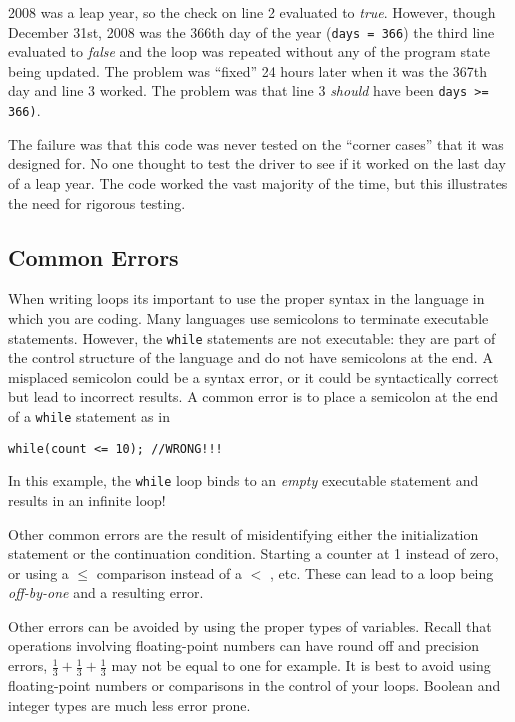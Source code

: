 2008 was a leap year, so the check on line 2 evaluated to \emph{true}.
However, though December 31st, 2008 was the 366th day of the year (\texttt{days = 366})
the third line evaluated to \emph{false} and the loop was repeated without any of
the program state being updated.  The problem was ``fixed'' 24 hours later when 
it was the 367th day and line 3 worked.  The problem was that line 3 \emph{should} have been
\texttt{days >= 366)}.  

The failure was that this code was never tested on the 
``corner cases'' that it was designed for.  No one thought to test the driver to see
if it worked on the last day of a leap year.  The code worked the vast majority of the time, 
but this illustrates the need for rigorous testing.

\subsection{Common Errors}

When writing loops its important to use the proper syntax in the
language in which you are coding.  Many languages use semicolons
to terminate executable statements.  However, the \texttt{while}
statements are not executable: they are part of the control structure
of the language and do not have semicolons at the end.  A misplaced
semicolon could be a syntax error, or it could be syntactically correct
but lead to incorrect results.  A common error is to place a semicolon
at the end of a \texttt{while} statement as in 

\texttt{while(count <= 10); //WRONG!!!}

In this example, the \texttt{while} loop binds to an \emph{empty}
executable statement and results in an infinite loop!

Other common errors are the result of misidentifying either the
initialization statement or the continuation condition.  Starting a
counter at 1 instead of zero, or using a $\leq$ comparison instead
of a $<$ , etc.  These can lead to a loop being \emph{off-by-one} 
and a resulting error.

Other errors can be avoided by using the proper types of variables.
Recall that operations involving floating-point numbers can have 
round off and precision errors, $\frac{1}{3} + \frac{1}{3} + \frac{1}{3}$
may not be equal to one for example.  It is best to avoid using 
floating-point numbers or comparisons in the control of your loops.
Boolean and integer types are much less error prone.  

